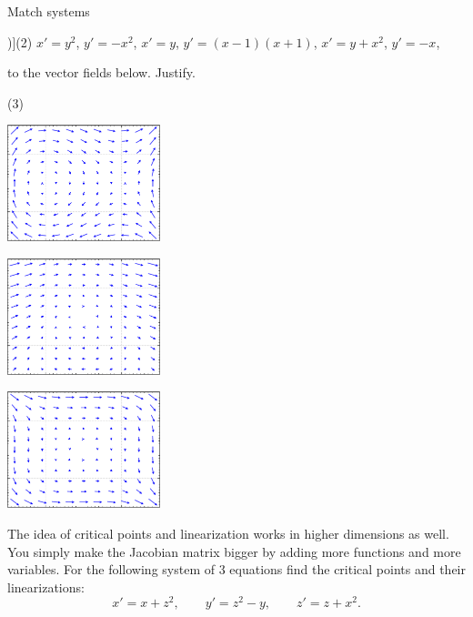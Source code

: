 \begin{exercise}
Match systems
\begin{tasks}[counter-format=tsk[1])](2)
\task $x'=y^2$, \enspace $y'=-x^2$,
\task $x'=y$, \enspace $y'=(x-1)(x+1)$,
\task $x'=y+x^2$, \enspace $y'=-x$,
\end{tasks}
to the vector fields below.  Justify.
\begin{tasks}(3)
\task
\parbox[c]{1.75in}{\includegraphics[width=1.75in]{figures/nlin-exer-y-xm1xp1}}
\task
\parbox[c]{1.75in}{\includegraphics[width=1.75in]{figures/nlin-exer-ypx2-mx}}
\task
\parbox[c]{1.75in}{\includegraphics[width=1.75in]{figures/nlin-exer-y2-mx2}}
\end{tasks}
\end{exercise}


\begin{samepage}
\begin{exercise}
The idea of critical points and linearization works in higher dimensions as
well.  You simply make the Jacobian matrix bigger by adding more functions
and more variables.  For the following system
of 3 equations find the critical points and their linearizations:
\begin{equation*}
x' = x + z^2, \qquad y' = z^2-y, \qquad z' = z+x^2.
\end{equation*}
\end{exercise}
\end{samepage}

